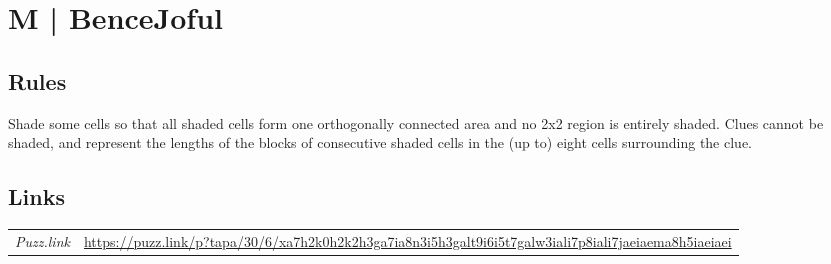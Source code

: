 \section[M | BenceJoful {[\emph{Tapa}]}]{M | {\normalfont BenceJoful}}
\label{sec:50-m-bencejoful}

\subsection*{Rules}
\begin{markdown}
Shade some cells so that all shaded cells form one orthogonally connected area and no 2x2 region is entirely shaded. Clues cannot be shaded, and represent the lengths of the blocks of consecutive shaded cells in the (up to) eight cells surrounding the clue.
\end{markdown}
\subsection*{Links}
\begin{tabularx}{\textwidth}{l X}
\emph{Puzz.link} & \url{https://puzz.link/p?tapa/30/6/xa7h2k0h2k2h3ga7ia8n3i5h3galt9i6i5t7galw3iali7p8iali7jaeiaema8h5iaeiaei} \\
\end{tabularx}
\pagebreak
